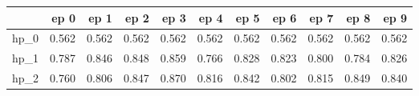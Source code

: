 \begin{tabular}{lrrrrrrrrrr}
\toprule
{} &   ep 0 &   ep 1 &   ep 2 &   ep 3 &   ep 4 &   ep 5 &   ep 6 &   ep 7 &   ep 8 &   ep 9 \\
\midrule
hp\_0 &  0.562 &  0.562 &  0.562 &  0.562 &  0.562 &  0.562 &  0.562 &  0.562 &  0.562 &  0.562 \\
hp\_1 &  0.787 &  0.846 &  0.848 &  0.859 &  0.766 &  0.828 &  0.823 &  0.800 &  0.784 &  0.826 \\
hp\_2 &  0.760 &  0.806 &  0.847 &  0.870 &  0.816 &  0.842 &  0.802 &  0.815 &  0.849 &  0.840 \\
\bottomrule
\end{tabular}
